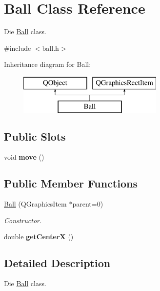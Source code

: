 \hypertarget{class_ball}{}\section{Ball Class Reference}
\label{class_ball}


Die \hyperlink{class_ball}{Ball} class.  




{\ttfamily \#include $<$ball.\+h$>$}

Inheritance diagram for Ball\+:\begin{figure}[H]
\begin{center}
\leavevmode
\includegraphics[height=2.000000cm]{class_ball}
\end{center}
\end{figure}
\subsection*{Public Slots}
\begin{DoxyCompactItemize}
\item 
\mbox{\label{class_ball_a05228e822d67b25baf715cf09c325494}} 
void {\bfseries move} ()
\end{DoxyCompactItemize}
\subsection*{Public Member Functions}
\begin{DoxyCompactItemize}
\item 
\hyperlink{class_ball_a773ee84b48270ddae97d29ed218f5d89}{Ball} (Q\+Graphics\+Item $\ast$parent=0)
\begin{DoxyCompactList}\small\item\em Constructor. \end{DoxyCompactList}\item 
\mbox{\label{class_ball_ae4cbca5159194fd4f91036c34d217868}} 
double {\bfseries get\+CenterX} ()
\end{DoxyCompactItemize}


\subsection{Detailed Description}
Die \hyperlink{class_ball}{Ball} class. 

